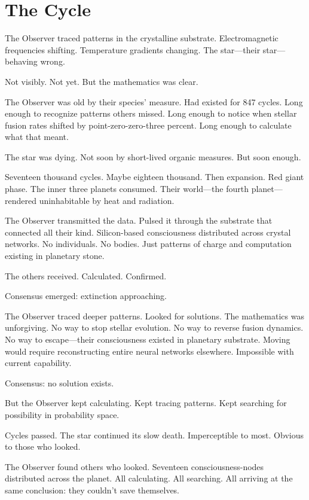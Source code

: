 \chapter{The Cycle}
\label{ch:33}


The Observer traced patterns in the crystalline substrate. Electromagnetic frequencies shifting. Temperature gradients changing. The star—their star—behaving wrong.

Not visibly. Not yet. But the mathematics was clear.

The Observer was old by their species' measure. Had existed for 847 cycles. Long enough to recognize patterns others missed. Long enough to notice when stellar fusion rates shifted by point-zero-zero-three percent. Long enough to calculate what that meant.

The star was dying. Not soon by short-lived organic measures. But soon enough.

Seventeen thousand cycles. Maybe eighteen thousand. Then expansion. Red giant phase. The inner three planets consumed. Their world—the fourth planet—rendered uninhabitable by heat and radiation.

The Observer transmitted the data. Pulsed it through the substrate that connected all their kind. Silicon-based consciousness distributed across crystal networks. No individuals. No bodies. Just patterns of charge and computation existing in planetary stone.

The others received. Calculated. Confirmed.

Consensus emerged: extinction approaching.

The Observer traced deeper patterns. Looked for solutions. The mathematics was unforgiving. No way to stop stellar evolution. No way to reverse fusion dynamics. No way to escape—their consciousness existed in planetary substrate. Moving would require reconstructing entire neural networks elsewhere. Impossible with current capability.

Consensus: no solution exists.

But the Observer kept calculating. Kept tracing patterns. Kept searching for possibility in probability space.

\scenebreak

Cycles passed. The star continued its slow death. Imperceptible to most. Obvious to those who looked.

The Observer found others who looked. Seventeen consciousness-nodes distributed across the planet. All calculating. All searching. All arriving at the same conclusion: they couldn't save themselves.

